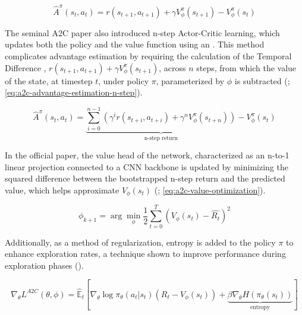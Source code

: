 \begin{equation}
    \hat{A}^{\pi}(s_t, a_t) = r(s_{t+1}, a_{t+1}) + \gamma V^{\pi}_{\phi}(s_{t+1}) - V^{\pi}_{\phi}(s_{t})
    \label{eq:a2c-advantage-estimation}
\end{equation}

\noindent The seminal A2C paper also introduced n-step Actor-Critic learning, which updates both the policy and the value function using an . This method complicates advantage estimation by requiring the calculation of the Temporal Difference , $r(s_{t+1}, a_{t+1}) + \gamma V^{\pi}_{\phi}(s_{t+1})$, across $n$ steps, from which the value of the state, at timestep $t$, under policy $\pi$, parameterized by $\phi$ is subtracted (\textcolor{deepblue}{\cite{mnih2016asynchronous}; \autoref{eq:a2c-advantage-estimation-n-step}}).

\begin{equation}
    \hat{A}^{\pi}(s_t, a_t) = \underbrace{{\sum_{i=0}^{n-1}} \left (\gamma^i r(s_{t+i}, a_{t+i}) + \gamma^n V^{\pi}_{\phi}(s_{t+n}) \right )}_{\text{n-step return}} - V^{\pi}_{\phi}(s_{t})
    \label{eq:a2c-advantage-estimation-n-step}
\end{equation}

\noindent In the official paper, the value head of the network, characterized as an n-to-1 linear projection connected to a CNN backbone is updated by minimizing the squared difference between the bootstrapped n-step return and the predicted value, which helps approximate $V_{\phi}(s_t)$ (\textcolor{deepblue}{\cite{mnih2016asynchronous}; \autoref{eq:a2c-value-optimization}}).

\begin{equation}
    \phi_{k+1} = \arg \min_{\phi} \frac{1}{2} \sum_{t=0}^{T} \left( V_\phi(s_t) - \hat{R_t} \right)^2
    \label{eq:a2c-value-optimization}
\end{equation}


\noindent Additionally, as a method of regularization, entropy is added to the policy $\pi$ to enhance exploration rates, a technique shown to improve performance during exploration phases (\textcolor{deepblue}{\cite{penge}}). 

\begin{equation}
    \nabla_{\theta} L^{A2C}(\theta, \phi) = \hat{\mathbb{E}}_{t} \left [ \nabla_{\theta}\log \pi_{\theta}(a_t | s_t) (R_t - V_{\phi}(s_t)) + \underbrace{\beta \nabla_{\theta} H(\pi_{\theta}(s_t))}_{\text{entropy}} \right]
    \label{eq:a2c-gradient-calculation}
\end{equation}

